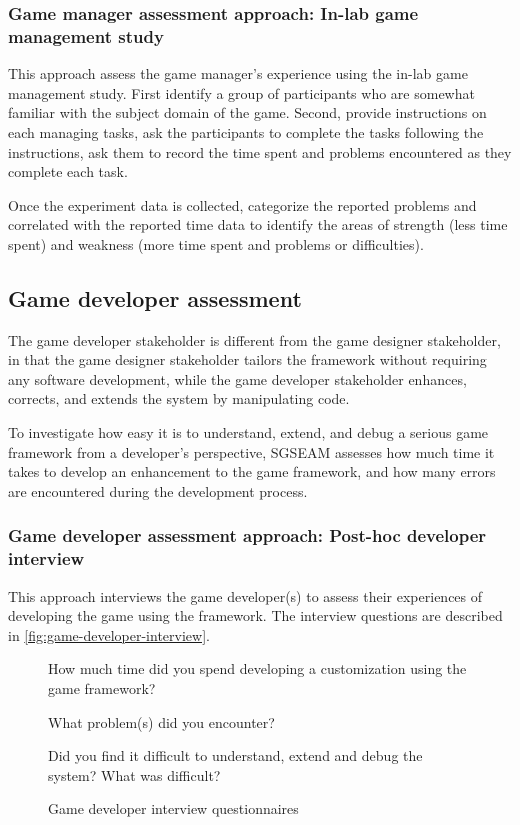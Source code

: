 \documentclass[11pt,oneside]{book}
\begin{document}
\subsubsection{Game manager assessment approach: In-lab game management study}
\label{In-lab game management study}

This approach assess the game manager's experience using the in-lab game management study.  First identify a group 
of participants who are somewhat familiar with the subject domain of the game. Second, provide instructions on 
each managing tasks, ask the participants to complete the tasks following the instructions, ask them to record 
the time spent and problems encountered as they complete each task.

Once the experiment data is collected, categorize the reported problems and correlated with the reported time data 
to identify the areas of strength (less time spent) and weakness (more time spent and problems or difficulties). 

\subsection{Game developer assessment}

The game developer stakeholder is different from the game designer stakeholder, in that the
game designer stakeholder tailors the framework without requiring any software
development, while the game developer stakeholder enhances, corrects, and extends the system by
manipulating code. 

To investigate how easy it is to understand, extend, and debug a serious game framework from a developer's 
perspective, SGSEAM assesses how much time it takes to develop an
enhancement to the game framework, and how many errors are encountered
during the development process.

\subsubsection{Game developer assessment approach: Post-hoc developer interview}
\label{Post-hoc game developer interview}

This approach interviews the game developer(s) to assess their experiences of developing the game 
using the framework. The interview questions are described in \autoref{fig:game-developer-interview}.  
 
\begin{figure}[ht!]
\begin{mybox}
\begin{compactenum}
\item How much time did you spend developing a customization using the game framework?
\item What problem(s) did you encounter?
\item Did you find it difficult to understand, extend and debug the system? What was difficult?\\
\end{compactenum}
\end{mybox}
\caption{Game developer interview questionnaires}
\label{fig:game-developer-interview}  
\end{figure}
\end{document}
